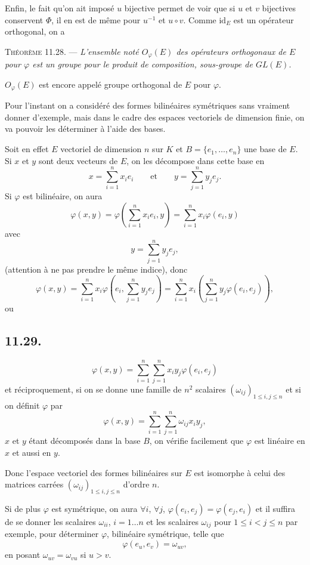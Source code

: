 Enfin, le fait qu'on ait imposé $u$ bijective permet de voir que si $u$ et $v$ bijectives conservent $\Phi$, il en est de même pour $u^{-1}$ et $u\circ v$. Comme $\mathrm{id}_E$ est un opérateur orthogonal, on a

\medskip\noindent\textsc{Théorème 11.28.} --- \emph{L'ensemble noté $O_\varphi(E)$ des opérateurs orthogonaux de $E$ pour $\varphi$ est un groupe pour le produit de composition, sous-groupe de $GL(E)$.} \bookend

$O_\varphi(E)$ est encore appelé groupe orthogonal de $E$ pour $\varphi$.


Pour l'instant on a considéré des formes bilinéaires symétriques sans vraiment donner d'exemple, mais dans le cadre des espaces vectoriels de dimension finie, on va pouvoir les déterminer à l'aide des bases.

Soit en effet $E$ vectoriel de dimension $n$ sur $K$ et $B=\{e_1,\ldots,e_n\}$ une base de $E$. Si $x$ et $y$ sont deux vecteurs de $E$, on les décompose dans cette base en
\[
x=\sum_{i=1}^n x_ie_i\qquad\text{et}\qquad y=\sum_{j=1}^n y_je_j.
\]
Si $\varphi$ est bilinéaire, on aura
\[
\varphi(x,y)=\varphi\left(\sum_{i=1}^n x_ie_i,y\right)=\sum_{i=1}^nx_i\varphi(e_i,y)
\]
avec
\[
y=\sum_{j=1}^ny_je_j,
\]
(attention à ne pas prendre le même indice), donc
\[
\varphi(x,y)=\sum_{i=1}^nx_i\varphi\left(e_i,\sum_{j=1}^ny_je_j\right)
=\sum_{i=1}^nx_i\left(\sum_{j=1}^ny_j\varphi(e_i,e_j)\right),
\]
ou

\subsection*{11.29.}
\[
\varphi(x,y)=\sum_{i=1}^n\sum_{j=1}^n x_iy_j\varphi(e_i,e_j)
\]
et réciproquement, si on se donne une famille de $n^2$ scalaires $(\omega_{ij})_{1\le i,j\le n}$ et si on définit $\varphi$ par
\[
\varphi(x,y)=\sum_{i=1}^n\sum_{j=1}^n\omega_{ij}x_iy_j,
\]
$x$ et $y$ étant décomposés dans la base $B$, on vérifie facilement que $\varphi$ est linéaire en $x$ et aussi en $y$.

Donc l'espace vectoriel des formes bilinéaires sur $E$ est isomorphe à celui des matrices carrées $(\omega_{ij})_{1\le i,j\le n}$ d'ordre $n$.

Si de plus $\varphi$ est symétrique, on aura $\forall i$, $\forall j$, $\varphi(e_i,e_j)=\varphi(e_j,e_i)$ et il suffira de se donner les scalaires $\omega_{ii}$, $i=1\ldots n$ et les scalaires $\omega_{ij}$ pour $1\le i<j\le n$ par exemple, pour déterminer $\varphi$, bilinéaire symétrique, telle que
\[
\varphi(e_u,e_v)=\omega_{uv},
\]
en posant $\omega_{uv}=\omega_{vu}$ si $u>v$.

